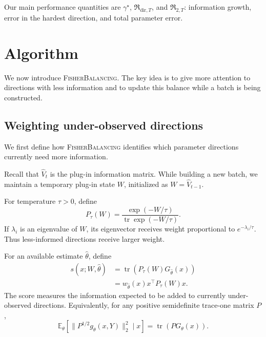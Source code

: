 \documentclass[10pt,twoside,letterpaper]{article}
\newcommand{\E}{\mathbb E}
\newcommand{\tr}{\operatorname{tr}}
\newcommand{\norm}[1]{\lVert #1\rVert}
\newcommand{\FB}{\textnormal{\textsc{FisherBalancing}}}
\newcommand{\Vhat}{\widehat V}
\newcommand{\Rdir}{\mathfrak R_{\mathrm{dir},T}}
\newcommand{\Rtwo}{\mathfrak R_{2,T}}
\begin{document}
Our main performance quantities are
$\gamma^\star$, $\Rdir$, and $\Rtwo$: information growth, error in the
hardest direction, and total parameter error.


\section{Algorithm}
\label{sec:algorithm}

We now introduce \FB{}. The key idea is to give more attention to
directions with less information and to update this balance while a batch
is being constructed.

\subsection{Weighting under-observed directions}

We first define how \FB{} identifies which parameter directions currently
need more information.

Recall that $\Vhat_t$ is the plug-in information matrix. While building
a new batch, we maintain a temporary plug-in state $W$, initialized as
$W=\Vhat_{t-1}$.

For temperature $\tau>0$, define
\begin{equation}
P_\tau(W)
=
\frac{\exp(-W/\tau)}
{\tr\exp(-W/\tau)}.
\label{eq:gibbs}
\end{equation}
If $\lambda_i$ is an eigenvalue of $W$, its eigenvector receives weight
proportional to $e^{-\lambda_i/\tau}$. Thus less-informed directions
receive larger weight.

For an available estimate $\widehat\theta$, define
\begin{equation}
\begin{aligned}
s(x;W,\widehat\theta)
&=
\tr\!\left(
P_\tau(W)G_{\widehat\theta}(x)
\right)\\
&=
w_{\widehat\theta}(x)
x^\top P_\tau(W)x.
\end{aligned}
\label{eq:score}
\end{equation}
The score measures the information expected to be added to currently
under-observed directions. Equivalently, for any positive semidefinite
trace-one matrix $P$,
\begin{equation}
\E_\theta
\left[
\norm{P^{1/2}g_\theta(x,Y)}_2^2
\mid x
\right]
=
\tr(PG_\theta(x)).
\label{eq:projected-score}
\end{equation}
\end{document}

